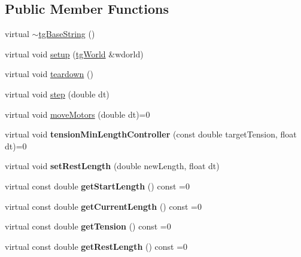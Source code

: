 \subsection*{Public Member Functions}
\begin{DoxyCompactItemize}
\item 
virtual \hyperlink{classtg_base_string_a4ca90e59fd04c0f440bdd7ebe3f3c800}{$\sim$tg\-Base\-String} ()
\item 
virtual void \hyperlink{classtg_base_string_a066210b878fc5307fc5a9271957a9c84}{setup} (\hyperlink{classtg_world}{tg\-World} \&wdorld)
\item 
virtual void \hyperlink{classtg_base_string_ae4470639491da403b0a29ef0f11ac7b2}{teardown} ()
\item 
virtual void \hyperlink{classtg_base_string_aadd5b654c0a426f83645c0d63525aefb}{step} (double dt)
\item 
virtual void \hyperlink{classtg_base_string_aa0f4ffc6a2be342451f20e3b21efcea8}{move\-Motors} (double dt)=0
\item 
\hypertarget{classtg_base_string_ade1963881d293e7ba8a309e6545a2baa}{virtual void {\bfseries tension\-Min\-Length\-Controller} (const double target\-Tension, float dt)=0}\label{classtg_base_string_ade1963881d293e7ba8a309e6545a2baa}

\item 
\hypertarget{classtg_base_string_a51c3d44ae19042cb3918ce8847888bc9}{virtual void {\bfseries set\-Rest\-Length} (double new\-Length, float dt)}\label{classtg_base_string_a51c3d44ae19042cb3918ce8847888bc9}

\item 
\hypertarget{classtg_base_string_a54b13a500305acf6f82ab70297c7eafe}{virtual const double {\bfseries get\-Start\-Length} () const =0}\label{classtg_base_string_a54b13a500305acf6f82ab70297c7eafe}

\item 
\hypertarget{classtg_base_string_afba729d20c3802de8b604ee672c9f854}{virtual const double {\bfseries get\-Current\-Length} () const =0}\label{classtg_base_string_afba729d20c3802de8b604ee672c9f854}

\item 
\hypertarget{classtg_base_string_a65e94a22e20b0b5ea62d1980b2f01920}{virtual const double {\bfseries get\-Tension} () const =0}\label{classtg_base_string_a65e94a22e20b0b5ea62d1980b2f01920}

\item 
\hypertarget{classtg_base_string_a9170ec97eedbcf0026cfff4ba5be02e6}{virtual const double {\bfseries get\-Rest\-Length} () const =0}\label{classtg_base_string_a9170ec97eedbcf0026cfff4ba5be02e6}


\end{DoxyCompactItemize}

